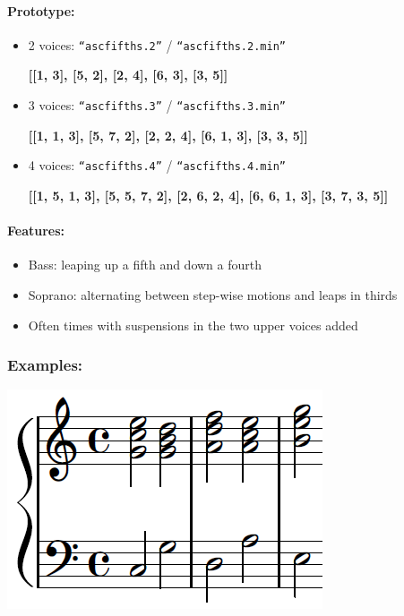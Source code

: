 ﻿\documentclass[11pt, openany]{article}
\begin{document}
\paragraph{Prototype:}
\begin{itemize}
\item 2 voices: \texttt{“ascfifths.2”} / \texttt{“ascfifths.2.min”}
	\begin{center}
    \textbf{[[1, 3], [5, 2], [2, 4], [6, 3], [3, 5]]}
    \end{center}
\item 3 voices: \texttt{“ascfifths.3”} / \texttt{“ascfifths.3.min”}
	\begin{center}
    \textbf{[[1, 1, 3], [5, 7, 2], [2, 2, 4], [6, 1, 3], [3, 3, 5]]}
    \end{center}
\item 4 voices: \texttt{“ascfifths.4”} / \texttt{“ascfifths.4.min”}
	\begin{center}
    \textbf{[[1, 5, 1, 3], [5, 5, 7, 2], [2, 6, 2, 4], [6, 6, 1, 3], [3, 7, 3, 5]]}
     \end{center}
\end{itemize}

\paragraph{Features:}
\begin{itemize}
\item Bass: leaping up a fifth and down a fourth
\item Soprano: alternating between step-wise motions and leaps in thirds
\item Often times with suspensions in the two upper voices added
\end{itemize}

\subsubsection{Examples:}
\begin{center}
\includegraphics[scale=0.5]{asc5th.png}
\end{center}
\end{document}
